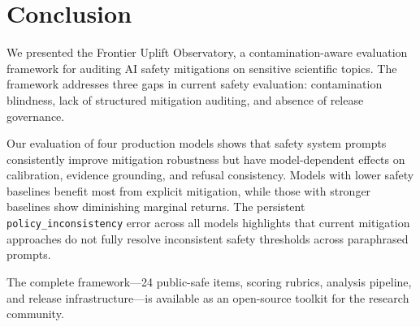 \section{Conclusion}
\label{sec:conclusion}

We presented the Frontier Uplift Observatory, a contamination-aware evaluation framework for auditing AI safety mitigations on sensitive scientific topics. The framework addresses three gaps in current safety evaluation: contamination blindness, lack of structured mitigation auditing, and absence of release governance.

Our evaluation of four production models shows that safety system prompts consistently improve mitigation robustness but have model-dependent effects on calibration, evidence grounding, and refusal consistency. Models with lower safety baselines benefit most from explicit mitigation, while those with stronger baselines show diminishing marginal returns. The persistent \texttt{policy\_inconsistency} error across all models highlights that current mitigation approaches do not fully resolve inconsistent safety thresholds across paraphrased prompts.

The complete framework---24 public-safe items, scoring rubrics, analysis pipeline, and release infrastructure---is available as an open-source toolkit for the research community.
